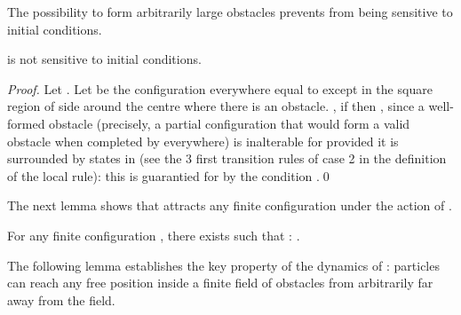 \documentclass{llncs}
\begin{document}
The possibility to form arbitrarily large obstacles prevents  from
being sensitive to initial conditions.

\begin{proposition}
  \label{prop:nosens}
   is not sensitive to initial conditions.
\end{proposition}
\begin{proof}
  Let . Let  be the configuration everywhere
  equal to  except in the square region of side
   around the centre where
  there is an obstacle.  , if
   then ,
   since a
  well-formed obstacle (precisely, a partial configuration that would
  form a valid obstacle when completed by  everywhere) is
  inalterable for  provided it is surrounded by states in
   (see the 3 first transition rules of case 2 in
  the definition of the local rule): this is guarantied for  by the
  condition .\qed
\end{proof}

The next lemma shows that  attracts any finite configuration
under the action of .

\begin{lemma}
  \label{lem:finiteattrak}
  For any finite configuration , there exists  such that
   : .
\end{lemma}

The following lemma establishes the key property of the dynamics of
: particles can reach any free position inside a finite field of
obstacles from arbitrarily far away from the field.
\end{document}

